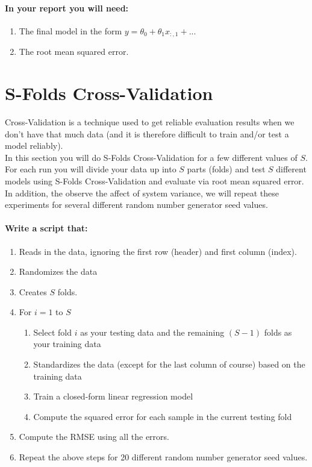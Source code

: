 \documentclass[12pt]{article}
\begin{document}
\paragraph{In your report you will need:}
\begin{enumerate}
\item The final model in the form $y=\theta_0+\theta_1x_{:,1} + ...$
\item The root mean squared error.
\end{enumerate}

\newpage
\section{S-Folds Cross-Validation}\label{linreg}
Cross-Validation is a technique used to get reliable evaluation results when we don't have that much data (and it is therefore difficult to train and/or test a model reliably).\\

\noindent
In this section you will do S-Folds Cross-Validation for a few different values of $S$.  For each run you will divide your data up into $S$ parts (folds) and test $S$ different models using S-Folds Cross-Validation and evaluate via root mean squared error.  In addition, the observe the affect of system variance, we will repeat these experiments for several different random number generator seed values.\\

\paragraph{Write a script that:}
\begin{enumerate}
  \item Reads in the data, ignoring the first row (header) and first column (index).
  \item Randomizes the data
  \item Creates $S$ folds.
  \item For $i=1$ to $S$
  \begin{enumerate}
  	\item Select fold $i$ as your testing data and the remaining $(S-1)$ folds as your training data
	\item Standardizes the data (except for the last column of course) based on the training data
	\item Train a closed-form linear regression model
  	\item Compute the squared error for each sample in the current testing fold
  \end{enumerate}
  \item Compute the RMSE using all the errors.
  \item Repeat the above steps for 20 different random number generator seed values.
\end{enumerate}
\end{document}
